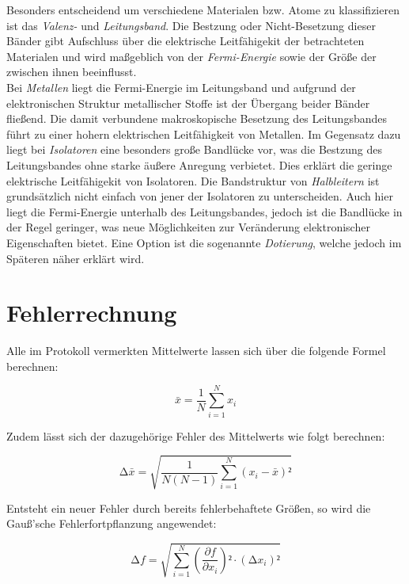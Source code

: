\noindent Besonders entscheidend um verschiedene Materialen bzw. Atome zu klassifizieren ist das \textit{Valenz-} und \textit{Leitungsband}. Die Bestzung 
oder Nicht-Besetzung dieser Bänder gibt Aufschluss über die elektrische Leitfähigekit der betrachteten Materialen und wird maßgeblich von der 
\textit{Fermi-Energie} sowie der Größe der  zwischen ihnen beeinflusst. \\

\noindent Bei \textit{Metallen} liegt die Fermi-Energie im Leitungsband und aufgrund der elektronischen Struktur metallischer Stoffe ist der Übergang beider 
Bänder fließend. Die damit verbundene makroskopische Besetzung des Leitungsbandes führt zu einer hohern elektrischen Leitfähigkeit von Metallen.
Im Gegensatz dazu liegt bei \textit{Isolatoren} eine besonders große Bandlücke vor, was die Bestzung des Leitungsbandes ohne starke äußere Anregung verbietet.
Dies erklärt die geringe elektrische Leitfähigekit von Isolatoren. Die Bandstruktur von \textit{Halbleitern} ist grundsätzlich nicht einfach von jener der 
Isolatoren zu unterscheiden. Auch hier liegt die Fermi-Energie unterhalb des Leitungsbandes, jedoch ist die Bandlücke in der Regel geringer, was neue 
Möglichkeiten zur Veränderung elektronischer Eigenschaften bietet. Eine Option ist die sogenannte \textit{Dotierung}, welche jedoch im Späteren 
näher erklärt wird.  

\section{Fehlerrechnung}
\label{sec:Fehlerrechnung}

Alle im Protokoll vermerkten Mittelwerte lassen sich über die folgende Formel berechnen:

\begin{equation}
\label{eqn:Mittelwert}
    \bar{x} = \frac{1}{N}\sum_{i=1}^N x_i
\end{equation}

\noindent Zudem lässt sich der dazugehörige Fehler des Mittelwerts wie folgt berechnen:

\begin{equation}
\label{eqn:Mittelwertfehler}
    \increment \bar{x} = \sqrt{\frac{1}{N\left(N-1\right)}\sum_{i=1}^N \left(x_i - \bar{x}\right)²}
\end{equation}

\noindent Entsteht ein neuer Fehler durch bereits fehlerbehaftete Größen, so wird die Gauß'sche Fehlerfortpflanzung angewendet:

\begin{equation}
\label{eqn:Fehlerfortpflanzung}
    \increment f = \sqrt{\sum_{i=1}^N \left(\frac{\partial f}{\partial x_i}\right)²\cdot\left(\increment x_i\right)²}
\end{equation}

